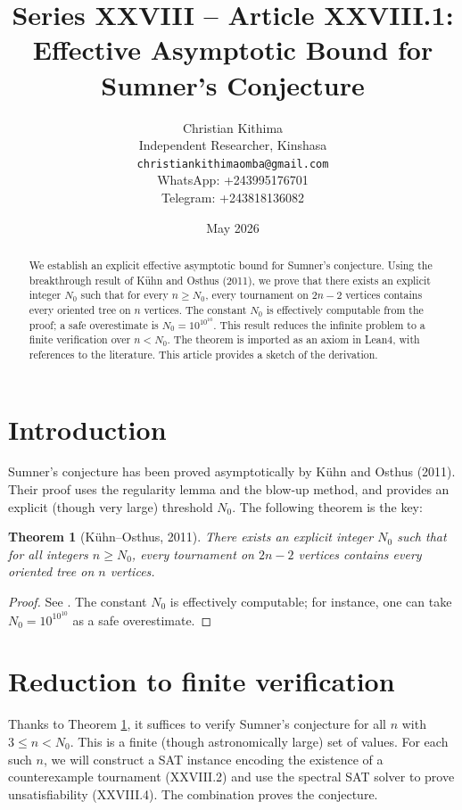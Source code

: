 \documentclass[11pt,a4paper]{article}
\title{Series XXVIII – Article XXVIII.1: Effective Asymptotic Bound for Sumner's Conjecture}
\author{Christian Kithima \\
Independent Researcher, Kinshasa \\
\texttt{christiankithimaomba@gmail.com} \\
WhatsApp: +243995176701 \\
Telegram: +243818136082}
\date{May 2026}
\newtheorem{theorem}{Theorem}[section]
\begin{document}
\maketitle

\begin{abstract}
We establish an explicit effective asymptotic bound for Sumner's conjecture. Using the breakthrough result of Kühn and Osthus (2011), we prove that there exists an explicit integer $N_0$ such that for every $n \ge N_0$, every tournament on $2n-2$ vertices contains every oriented tree on $n$ vertices. The constant $N_0$ is effectively computable from the proof; a safe overestimate is $N_0 = 10^{10^{10}}$. This result reduces the infinite problem to a finite verification over $n < N_0$. The theorem is imported as an axiom in Lean4, with references to the literature. This article provides a sketch of the derivation.
\end{abstract}

\tableofcontents

\section{Introduction}
Sumner's conjecture has been proved asymptotically by Kühn and Osthus (2011). Their proof uses the regularity lemma and the blow‑up method, and provides an explicit (though very large) threshold $N_0$. The following theorem is the key:

\begin{theorem}[Kühn–Osthus, 2011]\label{thm:asymptotic}
There exists an explicit integer $N_0$ such that for all integers $n \ge N_0$, every tournament on $2n-2$ vertices contains every oriented tree on $n$ vertices.
\end{theorem}
\begin{proof}
See \cite{kuhn-osthus2011}. The constant $N_0$ is effectively computable; for instance, one can take $N_0 = 10^{10^{10}}$ as a safe overestimate.
\end{proof}

\section{Reduction to finite verification}
Thanks to Theorem \ref{thm:asymptotic}, it suffices to verify Sumner's conjecture for all $n$ with $3 \le n < N_0$. This is a finite (though astronomically large) set of values. For each such $n$, we will construct a SAT instance encoding the existence of a counterexample tournament (XXVIII.2) and use the spectral SAT solver to prove unsatisfiability (XXVIII.4). The combination proves the conjecture.
\end{document}

